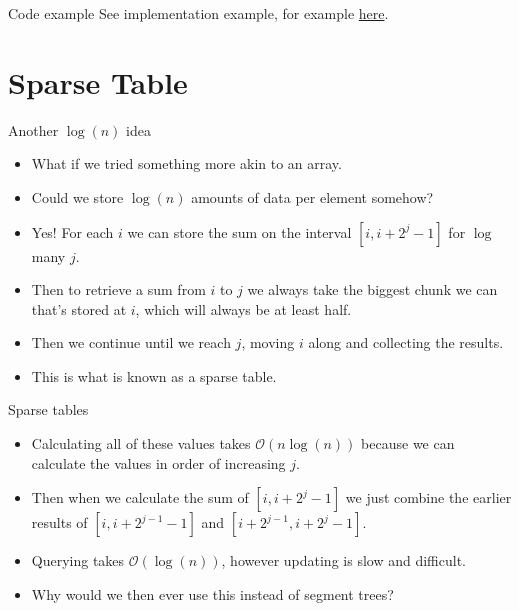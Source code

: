 \documentclass{beamer}
\begin{document}
\begin{frame}[plain]{Code example}
    See implementation example, for example \href{https://github.com/keppnisforritun/aflv_slides/tree/main/week7}{here}.
\end{frame}

\section*{Sparse Table}

\begin{frame}[plain]{Another $\log(n)$ idea}
    \begin{itemize}
        \item<1-> What if we tried something more akin to an array.
        \item<2-> Could we store $\log(n)$ amounts of data per element somehow?
        \item<3-> Yes! For each $i$ we can store the sum on the interval $[i, i + 2^j - 1]$ for $\log$ many $j$.
        \item<4-> Then to retrieve a sum from $i$ to $j$ we always take the biggest chunk we can that's stored at $i$, which will always be at least half.
        \item<5-> Then we continue until we reach $j$, moving $i$ along and collecting the results.
        \item<6-> This is what is known as a sparse table.
    \end{itemize}
\end{frame}

\begin{frame}[plain]{Sparse tables}
    \begin{itemize}
        \item<1-> Calculating all of these values takes $\mathcal{O}(n\log(n))$ because we can calculate the values in order of increasing $j$.
        \item<2-> Then when we calculate the sum of $[i, i + 2^j - 1]$ we just combine the earlier results of $[i, i + 2^{j-1} - 1]$ and $[i + 2^{j-1}, i + 2^j - 1]$.
        \item<3-> Querying takes $\mathcal{O}(\log(n))$, however updating is slow and difficult.
        \item<4-> Why would we then ever use this instead of segment trees?
    \end{itemize}
\end{frame}
\end{document}
